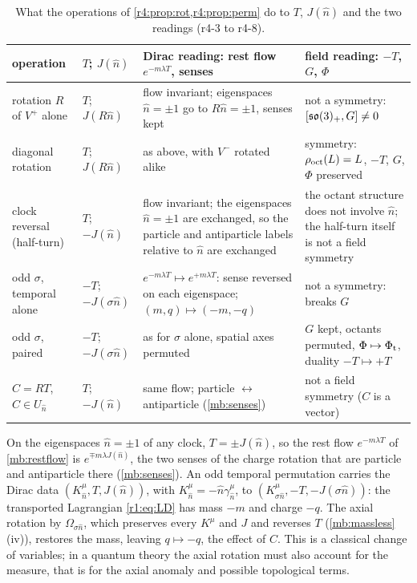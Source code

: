 \begin{table}[t]
\centering
\footnotesize
\setlength{\tabcolsep}{3pt}
\renewcommand{\arraystretch}{1.15}
\begin{tabular}{@{}>{\raggedright\arraybackslash}p{2.6cm}>{\raggedright\arraybackslash}p{1.9cm}>{\raggedright\arraybackslash}p{5.2cm}>{\raggedright\arraybackslash}p{5.0cm}@{}}
\toprule
operation & $T$; $J(\hat n)$ & Dirac reading: rest flow $e^{-m\lambda T}$, senses & field reading: $-T$, $G$, $\Phi$\\
\midrule
rotation $R$ of $V^+$ alone & $T$; $J(R\hat n)$ & flow invariant; eigenspaces $\hat n=\pm1$ go to $R\hat n=\pm1$, senses kept & not a symmetry: $[\mathfrak{so}(3)_+,G]\neq0$\\
diagonal rotation & $T$; $J(R\hat n)$ & as above, with $V^-$ rotated alike & symmetry: $\rho_{\rm oct}(L)=L$, $-T$, $G$, $\Phi$ preserved\\
clock reversal (half-turn) & $T$; $-J(\hat n)$ & flow invariant; the eigenspaces $\hat n=\pm1$ are exchanged, so the particle and antiparticle labels relative to $\hat n$ are exchanged & the octant structure does not involve $\hat n$; the half-turn itself is not a field symmetry\\
odd $\sigma$, temporal alone & $-T$; $-J(\sigma \hat n)$ & $e^{-m\lambda T}\mapsto e^{+m\lambda T}$: sense reversed on each eigenspace; $(m,q)\mapsto(-m,-q)$ & not a symmetry: breaks $G$\\
odd $\sigma$, paired & $-T$; $-J(\sigma \hat n)$ & as for $\sigma$ alone, spatial axes permuted & $G$ kept, octants permuted, $\Phi\mapsto\Phi_{\rm t}$, duality $-T\mapsto+T$\\
$C=RT$, $C\in U_{\hat n}$ & $T$; $-J(\hat n)$ & same flow; particle $\leftrightarrow$ antiparticle (\cref{mb:senses}) & not a field symmetry ($C$ is a vector)\\
\bottomrule
\end{tabular}
\caption{What the operations of \cref{r4:prop:rot,r4:prop:perm} do to $T$, $J(\hat n)$ and the two readings (r4-3 to r4-8).}
\label{r4:tab:ops}
\end{table}

\begin{corollary}
\label{r4:cor:senses}
On the eigenspaces $\hat n=\pm1$ of any clock, $T=\pm J(\hat n)$, so the rest flow $e^{-m\lambda T}$ of \cref{mb:restflow} is $e^{\mp m\lambda J(\hat n)}$, the two
senses of the charge rotation that are particle and antiparticle there (\cref{mb:senses}). An odd temporal permutation carries the
Dirac data $(K^\mu_{\hat n},T,J(\hat n))$, with $K^\mu_{\hat n}=-\hat n\gamma^\mu_{\hat n}$, to $(K^\mu_{\sigma \hat n},-T,-J(\sigma \hat n))$: the transported Lagrangian \cref{r1:eq:LD} has mass $-m$ and
charge $-q$. The axial rotation by $\Omega_{\sigma \hat n}$, which preserves every $K^\mu$ and $J$ and reverses $T$ (\cref{mb:massless}(iv)), restores the
mass, leaving $q\mapsto-q$, the effect of $C$. This is a classical change of variables; in a quantum theory the axial rotation must also
account for the measure, that is for the axial anomaly and possible topological terms.
\end{corollary}


